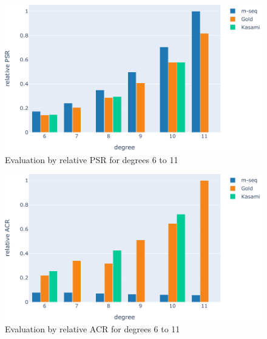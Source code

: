 \begin{figure}[h]
	\centering\includegraphics[width=13cm]{images/degPsrEva}
	
	\caption{Evaluation by relative PSR for degrees 6 to 11}
	\label{fig:eva}
\end{figure}

\begin{figure}[h]
	\centering\includegraphics[width=13cm]{images/degAcrEva}
	
	\caption{Evaluation by relative ACR for degrees 6 to 11}
	\label{fig:eva}
\end{figure}
